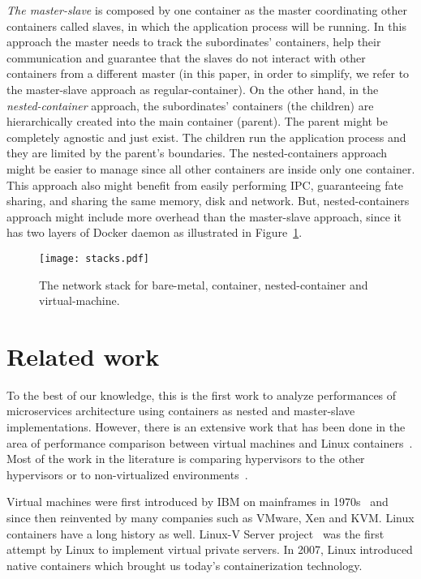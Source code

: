 \documentclass[conference]{IEEEtran}
\begin{document}
\emph{The master-slave} is composed by one container as the master coordinating
other containers called slaves, in which the application process
will be running. In this approach the master needs to track the subordinates'  
containers, help their communication and guarantee that the slaves do not
interact with other containers from a different master (in this paper, in
order to 
simplify, we refer to the master-slave approach as regular-container). On the 
other hand, in the \emph{nested-container} approach, the subordinates' 
containers (the children) are hierarchically created into the main container 
(parent). The parent might be completely agnostic and just exist. The children 
run the  application process and they are limited by the parent's 
boundaries. The nested-containers approach might be easier to manage since all 
other containers are inside only one container. This approach also might benefit
from easily performing IPC, guaranteeing fate sharing, and sharing the same 
memory, disk and network. But, nested-containers approach might include more 
overhead than the master-slave approach, since it has two layers of Docker 
daemon as illustrated in Figure~\ref{fig:network_stack}.

\begin{figure}[bth!]
    \center
    \texttt{[image: stacks.pdf]}
    \caption{The network stack for bare-metal, container, nested-container and
    virtual-machine.}
    \label{fig:network_stack}
\end{figure}




\section{Related work}
\label{sec:related}

To the best of our knowledge, this is the first work to analyze performances
of microservices architecture using containers as nested and master-slave implementations.
However, there is an extensive work that has been done in the area of
performance comparison between virtual machines and Linux
containers~\cite{Felter_2014}. Most of the work in the literature is comparing
hypervisors to the other hypervisors or to non-virtualized
environments~\cite{Huber_2011, Hwang_2013}.

Virtual machines were first introduced by IBM on mainframes in
1970s~\cite{Creasy_1981} and since then reinvented by many companies such as
VMware, Xen and KVM. Linux containers have a long history as well. Linux-V
Server project~\cite{Soltesz_2007} was the first attempt by Linux to implement
virtual private servers. In 2007, Linux introduced native containers which
brought us today's containerization technology. 
\end{document}
